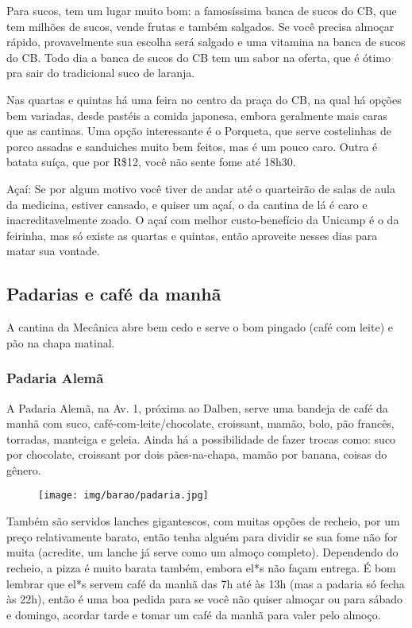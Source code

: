 Para sucos, tem um lugar muito bom: a famosíssima banca de sucos do CB, que tem
milhões de sucos, vende frutas e também salgados. Se você precisa almoçar
rápido, provavelmente sua escolha será salgado e uma vitamina na banca de sucos
do CB. Todo dia a banca de sucos do CB tem um sabor na oferta, que é ótimo pra
sair do tradicional suco de laranja.

Nas quartas e quintas há uma feira no centro da praça do CB, na qual há opções
bem variadas, desde pastéis a comida japonesa, embora geralmente mais caras que
as cantinas. Uma opção interessante é o Porqueta, que serve costelinhas de
porco assadas e sanduiches muito bem feitos, mas é um pouco caro. Outra é
batata suíça, que por R\$12, você não sente fome até 18h30.

Açaí: Se por algum motivo você tiver de andar até o quarteirão de salas de aula
da medicina, estiver cansado, e quiser um açaí, o da cantina de lá é caro e
inacreditavelmente zoado. O açaí com melhor custo-benefício da Unicamp é o da
feirinha, mas só existe as quartas e quintas, então aproveite nesses dias para
matar sua vontade.

\subsection{Padarias e café da manhã}

A cantina da Mecânica abre bem cedo e serve o bom pingado (café com leite) e
pão na chapa matinal.

\subsubsection{Padaria Alemã}

A Padaria Alemã, na Av. 1, próxima ao Dalben, serve uma bandeja de café da
manhã com suco, café-com-leite/chocolate, croissant, mamão, bolo, pão francês,
torradas, manteiga e geleia. Ainda há a possibilidade de fazer trocas como:
suco por chocolate, croissant por dois pães-na-chapa, mamão por banana, coisas
do gênero.

\begin{figure}[h!]
    \centering
    \texttt{[image: img/barao/padaria.jpg]}
\end{figure}

Também são servidos lanches gigantescos, com muitas opções de recheio, por um
preço relativamente barato, então tenha alguém para dividir se sua fome não for
muita (acredite, um lanche já serve como um almoço completo). Dependendo do
recheio, a pizza é muito barata também, embora el*s não façam entrega. É bom
lembrar que el*s servem café da manhã das 7h até às 13h (mas a padaria só fecha
às 22h), então é uma boa pedida para se você não quiser almoçar ou para sábado
e domingo, acordar tarde e tomar um café da manhã para valer pelo almoço.

